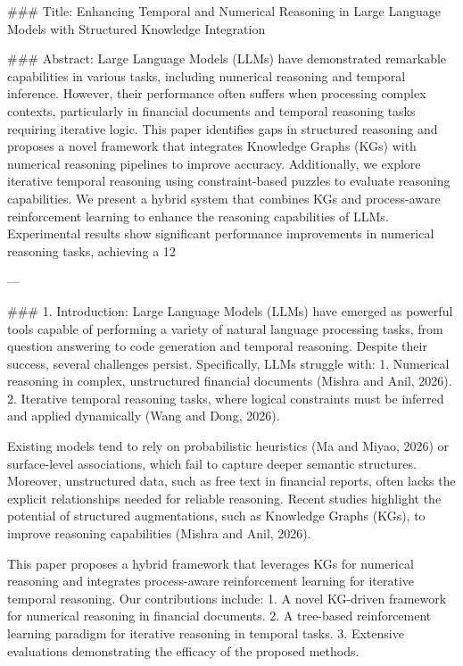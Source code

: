### Title:
Enhancing Temporal and Numerical Reasoning in Large Language Models with Structured Knowledge Integration

### Abstract:
Large Language Models (LLMs) have demonstrated remarkable capabilities in various tasks, including numerical reasoning and temporal inference. However, their performance often suffers when processing complex contexts, particularly in financial documents and temporal reasoning tasks requiring iterative logic. This paper identifies gaps in structured reasoning and proposes a novel framework that integrates Knowledge Graphs (KGs) with numerical reasoning pipelines to improve accuracy. Additionally, we explore iterative temporal reasoning using constraint-based puzzles to evaluate reasoning capabilities. We present a hybrid system that combines KGs and process-aware reinforcement learning to enhance the reasoning capabilities of LLMs. Experimental results show significant performance improvements in numerical reasoning tasks, achieving a 12%

---

### 1. Introduction:
Large Language Models (LLMs) have emerged as powerful tools capable of performing a variety of natural language processing tasks, from question answering to code generation and temporal reasoning. Despite their success, several challenges persist. Specifically, LLMs struggle with:
1. Numerical reasoning in complex, unstructured financial documents (Mishra and Anil, 2026).
2. Iterative temporal reasoning tasks, where logical constraints must be inferred and applied dynamically (Wang and Dong, 2026).

Existing models tend to rely on probabilistic heuristics (Ma and Miyao, 2026) or surface-level associations, which fail to capture deeper semantic structures. Moreover, unstructured data, such as free text in financial reports, often lacks the explicit relationships needed for reliable reasoning. Recent studies highlight the potential of structured augmentations, such as Knowledge Graphs (KGs), to improve reasoning capabilities (Mishra and Anil, 2026).

This paper proposes a hybrid framework that leverages KGs for numerical reasoning and integrates process-aware reinforcement learning for iterative temporal reasoning. Our contributions include:
1. A novel KG-driven framework for numerical reasoning in financial documents.
2. A tree-based reinforcement learning paradigm for iterative reasoning in temporal tasks.
3. Extensive evaluations demonstrating the efficacy of the proposed methods.

